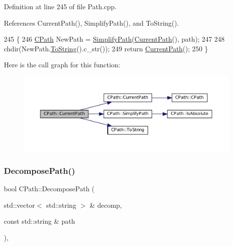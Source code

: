 Definition at line 245 of file Path.\+cpp.



References Current\+Path(), Simplify\+Path(), and To\+String().


\begin{DoxyCode}
245                                          \{
246     \hyperlink{classCPath}{CPath} NewPath = \hyperlink{classCPath_af0213a2ea0de0498ded236137e759922}{SimplifyPath}(\hyperlink{classCPath_a5161b834e754b217ddead2437eaaa223}{CurrentPath}(), path);
247     
248     chdir(NewPath.\hyperlink{classCPath_abbafaf377a7e38e0151bd9567d526951}{ToString}().c\_str());
249     \textcolor{keywordflow}{return} \hyperlink{classCPath_a5161b834e754b217ddead2437eaaa223}{CurrentPath}();
250 \}
\end{DoxyCode}
Here is the call graph for this function\+:\nopagebreak
\begin{figure}[H]
\begin{center}
\leavevmode
\includegraphics[width=350pt]{classCPath_a87ec01e5af0eb4e2184caf1d9ecc8892_cgraph}
\end{center}
\end{figure}
\hypertarget{classCPath_aae05f3c3502e92bf68d5ce71264c7bb9}{}\label{classCPath_aae05f3c3502e92bf68d5ce71264c7bb9} 
\subsubsection{\texorpdfstring{Decompose\+Path()}{DecomposePath()}}
{\footnotesize\ttfamily bool C\+Path\+::\+Decompose\+Path (\begin{DoxyParamCaption}\item[{std\+::vector$<$ std\+::string $>$ \&}]{decomp,  }\item[{const std\+::string \&}]{path }\end{DoxyParamCaption})\hspace{0.3cm}{\ttfamily [static]}, {\ttfamily [protected]}}



